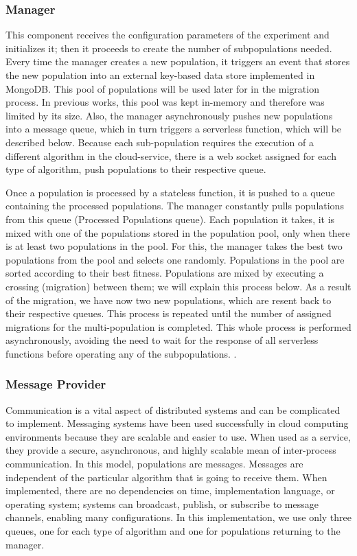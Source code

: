 \documentclass[runningheads]{llncs}
\begin{document}
\subsubsection{Manager}

This component receives the configuration parameters of
  the experiment and initializes it; then it proceeds to create the
  number of subpopulations needed. Every time the manager creates a new
  population, it triggers an event that stores the new population into 
  an external key-based data store implemented in MongoDB.  
  This pool of populations will be used later for in 
  the migration process. In previous works, this pool was kept in-memory and
  therefore was limited by its size. Also, the manager asynchronously 
  pushes new populations into a message queue,
  which in turn triggers a serverless function, which will be
  described below. Because each sub-population requires the execution 
  of a different algorithm in the cloud-service, there is a web socket 
  assigned for each type of algorithm, push populations to
  their respective queue.

  Once a population is processed by a stateless function, it is 
  pushed to a queue containing the processed populations. 
  The manager constantly pulls populations from this queue
  (Processed Populations queue). Each population it takes,
  it is mixed with one of the populations stored in the population pool, only when 
  there is at least two populations in the pool.
  For this, the manager takes the best two populations from
  the pool and selects one randomly. Populations in the pool are
  sorted according to their best fitness. Populations are mixed by executing
  a crossing (migration) between them; we will explain this process below. As a result of
  the migration, we have now two new populations, which are resent back
  to their respective queues. This process is repeated until the number of
  assigned migrations for the multi-population \cite{Ma2019,Santander-jim2018}
  is completed. 
  This whole process is performed asynchronously, avoiding the need to wait 
  for the response of all serverless functions before operating any of 
  the subpopulations. \cite{Lovbjerg2001,Jimeno2019}. 

  \subsubsection{Message Provider}

  Communication is a vital aspect of distributed
systems and can be complicated to implement. Messaging systems have been used
successfully in cloud computing environments because they are scalable and
easier to use. When used as a service, they provide a secure, asynchronous, and
highly scalable mean of inter-process communication.  In this model, populations
are messages.  Messages are independent of the particular algorithm that is
going to receive them. When implemented, there are no dependencies on time,
implementation language, or operating system; systems can broadcast, publish, or
subscribe to message channels, enabling many configurations. In this
implementation,  we use only three queues, one for each type of algorithm and
one for populations returning to the manager.
\end{document}
